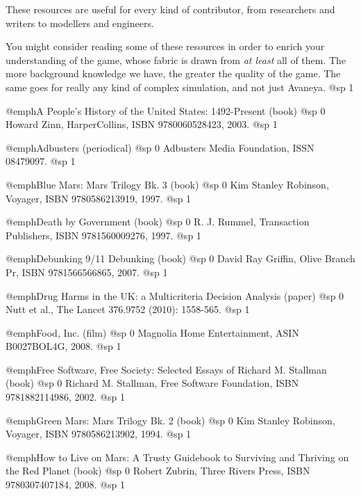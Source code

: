 These resources are useful for every kind of contributor, from researchers and writers to modellers and engineers.

You might consider reading some of these resources in order to enrich your understanding of the game, whose fabric is drawn from {\sl at least} all of them. The more background knowledge we have, the greater the quality of the game. The same goes for really any kind of complex simulation, and not just Avaneya.
@sp 1

\itemize

\item
@emph{A People's History of the United States: 1492-Present} (book)
@sp 0
Howard Zinn, HarperCollins, ISBN 9780060528423, 2003.
@sp 1

\item
@emph{Adbusters} (periodical)
@sp 0
Adbusters Media Foundation, ISSN 08479097.
@sp 1

\item
@emph{Blue Mars: Mars Trilogy Bk. 3} (book)
@sp 0
Kim Stanley Robinson, Voyager, ISBN 9780586213919, 1997.
@sp 1

\item
@emph{Death by Government} (book)
@sp 0
R. J. Rummel, Transaction Publishers, ISBN 9781560009276, 1997.
@sp 1

\item
@emph{Debunking 9/11 Debunking} (book)
@sp 0
David Ray Griffin, Olive Branch Pr, ISBN 9781566566865, 2007.
@sp 1

\item
@emph{Drug Harms in the UK: a Multicriteria Decision Analysis} (paper)
@sp 0
Nutt et al., The Lancet 376.9752 (2010): 1558-565.
@sp 1

\item
@emph{Food, Inc.} (film)
@sp 0
Magnolia Home Entertainment, ASIN B0027BOL4G, 2008.
@sp 1

\item
@emph{Free Software, Free Society: Selected Essays of Richard M. Stallman} (book)
@sp 0
Richard M. Stallman, Free Software Foundation, ISBN 9781882114986, 2002.
@sp 1

\item
@emph{Green Mars: Mars Trilogy Bk. 2} (book)
@sp 0
Kim Stanley Robinson, Voyager, ISBN 9780586213902, 1994.
@sp 1

\item
@emph{How to Live on Mars: A Trusty Guidebook to Surviving and Thriving on the Red Planet} (book)
@sp 0
Robert Zubrin, Three Rivers Press, ISBN 9780307407184, 2008.
@sp 1

